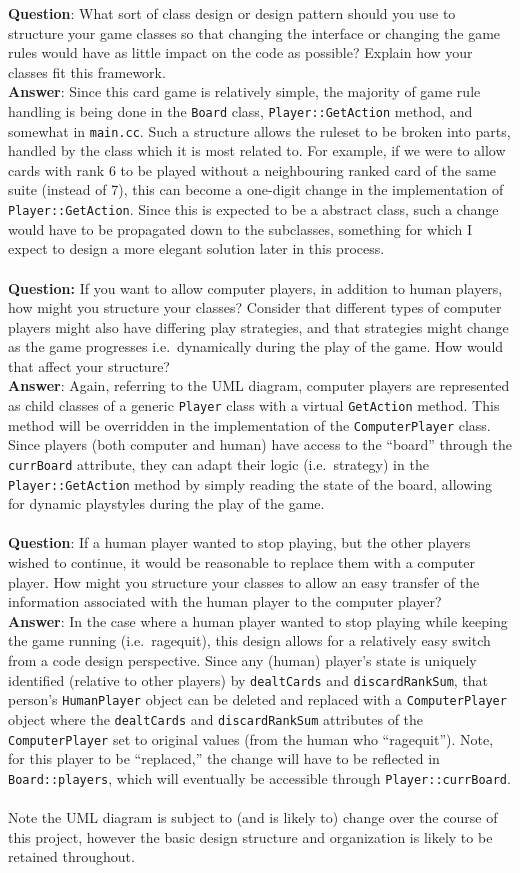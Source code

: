 \documentclass[10pt]{article}
\begin{document}
		{\bf Question}: What sort of class design or design pattern should you use to structure your game classes so that changing the interface or changing the game rules would have as little impact on the code as possible? Explain how your classes fit this framework.\\
		{\bf Answer}: Since this card game is relatively simple, the majority of game rule handling is being done in the {\tt Board} class, {\tt Player::GetAction} method, and somewhat in {\tt main.cc}. Such a structure allows the ruleset to be broken into parts, handled by the class which it is most related to. For example, if we were to allow cards with rank 6 to be played without a neighbouring ranked card of the same suite (instead of 7), this can become a one-digit change in the implementation of {\tt Player::GetAction}. Since this is expected to be a abstract class, such a change would have to be propagated down to the subclasses, something for which I expect to design a more elegant solution later in this process.
		\\\\
		{\bf Question:} If you want to allow computer players, in addition to human players, how might you structure your classes? Consider that different types of computer players might also have differing play strategies, and that strategies might change as the game progresses i.e.\ dynamically during the play of the game. How would that affect your structure?\\
		{\bf Answer}: Again, referring to the UML diagram, computer players are represented as child classes of a generic {\tt Player} class with a virtual {\tt GetAction} method. This method will be overridden in the implementation of the {\tt ComputerPlayer} class. Since players (both computer and human) have access to the ``board'' through the {\tt currBoard} attribute, they can adapt their logic (i.e.\ strategy) in the {\tt Player::GetAction} method by simply reading the state of the board, allowing for dynamic playstyles during the play of the game.
		\\\\
		{\bf Question}: If a human player wanted to stop playing, but the other players wished to continue, it would be reasonable to replace them with a computer player. How might you structure your classes to allow an easy transfer of the information associated with the human player to the computer player?\\
		{\bf Answer}: In the case where a human player wanted to stop playing while keeping the game running (i.e.\ ragequit), this design allows for a relatively easy switch from a code design perspective. Since any (human) player's state is uniquely identified (relative to other players) by {\tt dealtCards} and {\tt discardRankSum}, that person's {\tt HumanPlayer} object can be deleted and replaced with a {\tt ComputerPlayer} object where the {\tt dealtCards} and {\tt discardRankSum} attributes of the {\tt ComputerPlayer} set to original values (from the human who ``ragequit''). Note, for this player to be ``replaced,'' the change will have to be reflected in {\tt Board::players}, which will eventually be accessible through {\tt Player::currBoard}.
		\\\\

		Note the UML diagram is subject to (and is likely to) change over the course of this project, however the basic design structure and organization is likely to be retained throughout.
\end{document}
